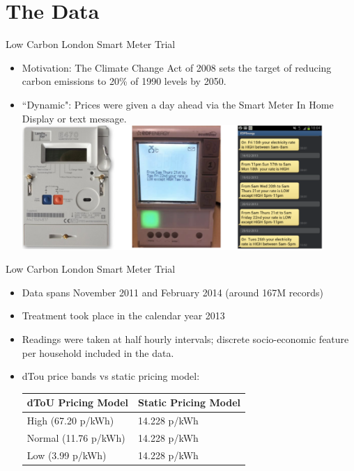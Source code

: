 \documentclass{beamer}
\begin{document}
\section{The Data}

\begin{frame}{Low Carbon London Smart Meter Trial}
  \begin{itemize}
    \item<+-> Motivation: The Climate Change Act of 2008 sets the target of reducing carbon emissions to 20\% of 1990 levels by 2050.
    \item<+-> ``Dynamic": Prices were given a day ahead via the Smart Meter In Home Display or text message.
    \vspace{0.4cm}
    \centering
    \includegraphics[width=0.9\textwidth]{images/day-ahead-pricing.png}
  \end{itemize}
\end{frame}

\begin{frame}{Low Carbon London Smart Meter Trial}
  \begin{itemize}
    \item<+-> Data spans November 2011 and February 2014 (around 167M records)
    \item<+-> Treatment took place in the calendar year 2013
    \item<+-> Readings were taken at half hourly intervals; discrete socio-economic feature per household included in the data.
    \item<+-> dTou price bands vs static pricing model:
    \begin{table}[]
      \vspace{0.2cm}
      \centering
      \begin{tabular}{|l|l|}
        \hline
        dToU Pricing Model & Static Pricing Model \\ \hline
        High (67.20 p/kWh) & 14.228 p/kWh \\ \hline
        Normal (11.76 p/kWh) & 14.228 p/kWh \\ \hline
        Low (3.99 p/kWh) & 14.228 p/kWh \\ \hline
      \end{tabular}
    \end{table}
  \end{itemize}
\end{frame}
\end{document}
